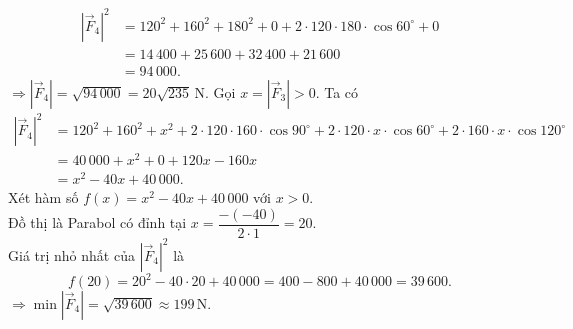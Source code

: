 \begin{ex}
{\begin{itemchoice}
			\allowdisplaybreaks
			\begin{align*}
				\left|\overrightarrow{F}_4\right|^2 &= 120^2+160^2+180^2+0+2\cdot 120\cdot 180\cdot\cos 60^\circ+0\\
				&= 14\,400+25\,600+32\,400+21\,600\\
				&= 94\,000.
			\end{align*}
			$\Rightarrow \left|\overrightarrow{F}_4\right|=\sqrt{94\,000}=20\sqrt{235}\mathrm{\,N}$.
			\itemch Gọi $x=\left|\overrightarrow{F}_3\right|>0$. Ta có
			\allowdisplaybreaks
			\begin{align*}
				\left|\overrightarrow{F}_4\right|^2 &= 120^2+160^2+x^2+2\cdot 120\cdot 160\cdot\cos 90^\circ+2\cdot 120\cdot x\cdot\cos 60^\circ+2\cdot 160\cdot x\cdot\cos 120^\circ\\
				&= 40\,000+x^2+0+120x-160x\\
				&= x^2-40x+40\,000.
			\end{align*}
			Xét hàm số $f(x)=x^2-40x+40\,000$ với $x>0$. \\
			Đồ thị là Parabol có đỉnh tại $x=\dfrac{-(-40)}{2\cdot 1}=20$.\\
			Giá trị nhỏ nhất của $\left|\overrightarrow{F}_4\right|^2$ là 
			\[f(20)=20^2-40\cdot 20+40\,000=400-800+40\,000=39\,600.\]
			$\Rightarrow\min \left|\overrightarrow{F}_4\right|=\sqrt{39\,600}\approx 199\mathrm{\,N}$.
		\end{itemchoice}
	}
\end{ex}

